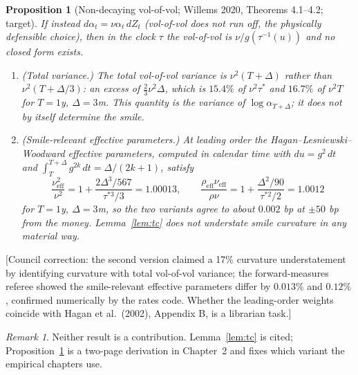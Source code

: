 \documentclass[11pt,a4paper]{article}
\newcommand{\corr}[1]{{\color{ox}\textsf{\small [Council correction: #1]}}}
\newcommand{\target}{{\color{teal}\textsf{\small target}}}
\theoremstyle{plain}
\newtheorem{proposition}[theorem]{Proposition}
\theoremstyle{definition}
\theoremstyle{remark}
\newtheorem*{remark}{Remark}
\begin{document}
\begin{proposition}[Non-decaying vol-of-vol; Willems 2020, Theorems 4.1--4.2; \target]\label{prop:novol}
If instead $d\alpha_t=\nu\alpha_t\,dZ_t$ (vol-of-vol does not run off, the physically defensible choice), then in the clock $\tau$ the vol-of-vol is $\nu/g(\tau^{-1}(u))$ and no closed form exists.
\begin{enumerate}[nosep,label=(\roman*)]
\item (Total variance.) The total vol-of-vol variance is $\nu^2(T+\Delta)$ rather than $\nu^2(T+\Delta/3)$: an excess of $\tfrac23\nu^2\Delta$, which is $15.4\%$ of $\nu^2\tau^*$ and $16.7\%$ of $\nu^2T$ for $T=1$y, $\Delta=3$m. This quantity is the variance of $\log\alpha_{T+\Delta}$; it does not by itself determine the smile.
\item (Smile-relevant effective parameters.) At leading order the Hagan--Lesniewski--Woodward effective parameters, computed in calendar time with $du=g^2\,dt$ and $\int_T^{T+\Delta}g^{2k}\,dt=\Delta/(2k+1)$, satisfy
\[
\frac{\nu_{\mathrm{eff}}^2}{\nu^2}=1+\frac{2\Delta^3/567}{\tau^{*3}/3}=1.00013,\qquad \frac{\rho_{\mathrm{eff}}\nu_{\mathrm{eff}}}{\rho\nu}=1+\frac{\Delta^2/90}{\tau^{*2}/2}=1.0012
\]
for $T=1$y, $\Delta=3$m, so the two variants agree to about $0.002$ bp at $\pm50$ bp from the money. Lemma~\ref{lem:tc} does not understate smile curvature in any material way.
\end{enumerate}
\end{proposition}
\corr{the second version claimed a 17\% curvature understatement by identifying curvature with total vol-of-vol variance; the forward-measures referee showed the smile-relevant effective parameters differ by $0.013\%$ and $0.12\%$, confirmed numerically by the rates code. Whether the leading-order weights coincide with Hagan et al.\ (2002), Appendix B, is a librarian task.}

\begin{remark}
Neither result is a contribution. Lemma~\ref{lem:tc} is cited; Proposition~\ref{prop:novol} is a two-page derivation in Chapter~2 and fixes which variant the empirical chapters use.
\end{remark}
\end{document}
